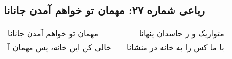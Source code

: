 \begin{center}
\section*{رباعی شماره ۲۷: مهمان تو خواهم آمدن جانانا}
\label{sec:sh027}
\begin{longtable}{l p{0.5cm} r}
مهمان تو خواهم آمدن جانانا
&&
متواریک و ز حاسدان پنهانا
\\
خالی کن این خانه، پس مهمان آ
&&
با ما کس را به خانه در منشانا
\\
\end{longtable}
\end{center}
